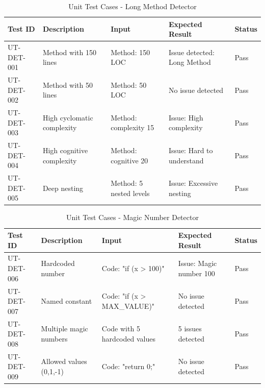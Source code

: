 \documentclass[12pt,a4paper]{article}
\begin{document}
    \begin{table}[H]
        \caption{Unit Test Cases - Long Method Detector}
        \begin{tabular}{|p{2cm}|p{4cm}|p{3cm}|p{3cm}|p{1.5cm}|}
            \hline
            \textbf{Test ID} & \textbf{Description} & \textbf{Input} & \textbf{Expected Result} & \textbf{Status} \\
            \hline
            UT-DET-001 & Method with 150 lines & Method: 150 LOC & Issue detected: Long Method & Pass \\
            \hline
            UT-DET-002 & Method with 50 lines & Method: 50 LOC & No issue detected & Pass \\
            \hline
            UT-DET-003 & High cyclomatic complexity & Method: complexity 15 & Issue: High complexity & Pass \\
            \hline
            UT-DET-004 & High cognitive complexity & Method: cognitive 20 & Issue: Hard to understand & Pass \\
            \hline
            UT-DET-005 & Deep nesting & Method: 5 nested levels & Issue: Excessive nesting & Pass \\
            \hline
        \end{tabular}
    \end{table}

    \begin{table}[H]
        \caption{Unit Test Cases - Magic Number Detector}
        \begin{tabular}{|p{2cm}|p{4cm}|p{3cm}|p{3cm}|p{1.5cm}|}
            \hline
            \textbf{Test ID} & \textbf{Description} & \textbf{Input} & \textbf{Expected Result} & \textbf{Status} \\
            \hline
            UT-DET-006 & Hardcoded number & Code: "if (x > 100)" & Issue: Magic number 100 & Pass \\
            \hline
            UT-DET-007 & Named constant & Code: "if (x > MAX\_VALUE)" & No issue detected & Pass \\
            \hline
            UT-DET-008 & Multiple magic numbers & Code with 5 hardcoded values & 5 issues detected & Pass \\
            \hline
            UT-DET-009 & Allowed values (0,1,-1) & Code: "return 0;" & No issue detected & Pass \\
            \hline
        \end{tabular}
    \end{table}
\end{document}
